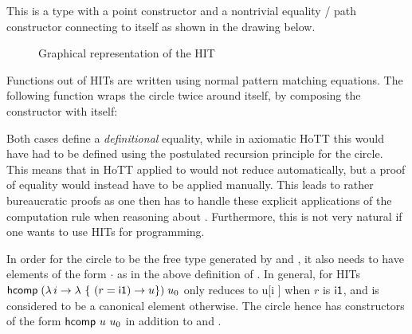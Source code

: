 This is a type with a point constructor  and a nontrivial
equality / path constructor  connecting  to itself
as shown in the drawing below.

\begin{figure}[!h]
\begin{center}
\end{center}
\caption{Graphical representation of the HIT }
\end{figure}

Functions out of HITs are written using normal \Agda pattern
matching equations. The following function wraps the circle twice
around itself, by composing the  constructor with itself:
%
% 

Both cases define a \emph{definitional} equality, while in axiomatic HoTT
this would have had to be defined using the postulated recursion
principle for the circle. This means that in HoTT 
applied to  would not reduce automatically, but a
proof of equality would instead have to be applied
manually. This leads to rather bureaucratic proofs as one then has to
handle these explicit applications of the computation rule when
reasoning about . Furthermore, this is not very natural
if one wants to use HITs for programming.

In order for the circle to be the free type generated by 
and , it also needs to have elements of the form 
$\cdot$  as in the above definition of . 
% 
In general, for HITs 
$\func{hcomp}\;(\lambda\,i\to\lambda~\{~(r = \io) \to u\})\;u_0$ 
only reduces to u[\substnop i {\io}] when $r$ is $\io$, and is
considered to be a canonical element otherwise. The circle hence has
constructors of the form $\hcompcon~u~u_0$ in addition to 
and . 

